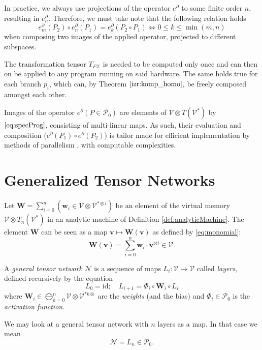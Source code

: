 \documentclass[11pt]{article}
\newcommand{\bfW}{\mathbf{W}}
\newcommand{\bfw}{\mathbf{w}}
\newcommand{\VV}{\mathcal{V}}
\newcommand{\NN}{\mathcal{N}}
\newcommand{\vv}{\mathbf{v}}
\newcommand{\X}{\mathcal{X}}
\newcommand{\dP}{\mathcal{P}}
\newcommand{\D}{\partial}
\begin{document}
\begin{remark}
In practice, we always use projections of the operator $e^\D$ to some finite order $n$, resulting in $e^\D_n$. Therefore, we must take note that the following relation holds
\begin{equation*}
e^\D_m(P_2)\circ e^\D_n(P_1)=e^\D_k(P_2\circ P_1)\iff 0\le k\le \min(m,n)
\end{equation*}
when composing two images of the applied operator, projected to different subspaces.
\end{remark}

The transformation tensor $T_{F\X}$ is needed to be computed only once and can then on be applied to any program running on said hardware. The same holds true for each branch $p_i$, which can, by Theorem $\ref{izr:komp_homo}$, be freely composed amongst each other.

\begin{remark}\label{clm:paralel}
Images of the operator $e^\D (P\in\dP_0)$ are elements of $\VV\otimes T(\VV^*)$ by $\eqref{eq:specProg}$, consisting of multi-linear maps. As such, their evaluation and composition ($e^\D(P_1)\circ e^\D(P_2)$) is tailor made for efficient implementation by methods of parallelism \citep[e.g.,][]{TensorGPU}, with computable complexities.
\end{remark}

\section{Generalized Tensor Networks}\label{sec:generalTensorNet}

Let $\bfW=\sum\limits_{i=0}^n(\bfw_i\in \VV\otimes \VV^{*\otimes i})$ be an element of the virtual memory $\VV\otimes T_n(\VV^*)$ in an
analytic machine of Definition \ref{def:analyticMachine}. The element $\bfW$ can
be seen as a map 
$\vv\mapsto \bfW(\vv)$ as defined by \eqref{eq:monomial}:
\begin{equation*}
\bfW(\vv)=\sum\limits_{i=0}^n\bfw_i\cdot\vv^{\otimes i}\in \VV.
\end{equation*}

\begin{definition}
  \label{def:tensor_network}
A \emph{general tensor network} $\NN$ is a sequence of maps $L_i:\VV\to \VV$  called
\emph{layers}, defined recursively by the equation 
\begin{equation*}
L_0=\mathrm{id};\quad L_{i+1}=\Phi_i\circ\mathbf{W}_i\circ L_i
\end{equation*}
where $\mathbf{W}_i\in \bigoplus\limits_{k=0}^n\VV\otimes \VV^{*k\otimes}$ are
the \emph{weights} (and the bias) and $\Phi_i\in\dP_0$ is the \emph{activation
  function}.
\end{definition}
We may look at a general tensor network with $n$ layers as a map. In that case
we mean
\begin{equation*}
\NN=L_n\in\dP_0.
\end{equation*}
\end{document}
